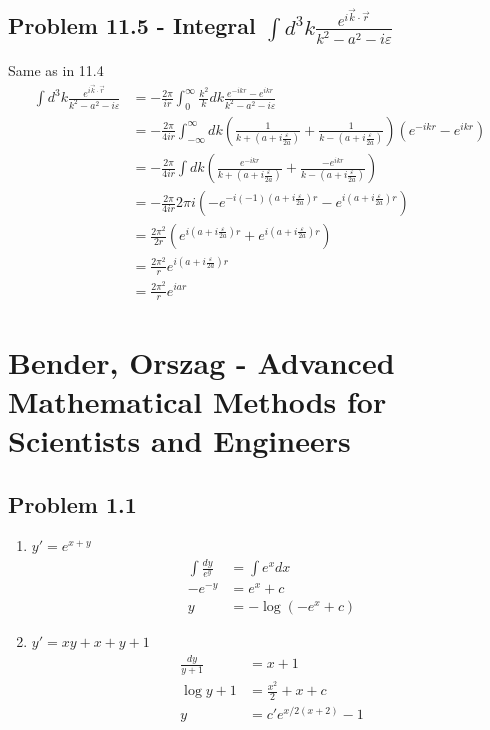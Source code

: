\documentclass[10pt,a4paper]{book}
\theoremstyle{definition}
\begin{document}
\subsection{Problem 11.5 - Integral $\int d^3k \frac{e^{i\vec{k}\cdot\vec{r}}}{k^2-a^2-i\varepsilon}$}
Same as in 11.4
\begin{align}
\int d^3k \frac{e^{i\vec{k}\cdot\vec{r}}}{k^2-a^2-i\varepsilon}
&=-\frac{2\pi}{ir}\int_0^\infty \frac{k^2}{k}dk \frac{e^{-ikr}-e^{ikr}}{k^2-a^2-i\varepsilon}\\
&=-\frac{2\pi}{4ir}\int_{-\infty}^\infty dk \left(\frac{1}{k+(a+i\frac{\varepsilon}{2a})}+\frac{1}{k-(a+i\frac{\varepsilon}{2a})}\right)(e^{-ikr}-e^{ikr})\\
&=-\frac{2\pi}{4ir}\int dk \left(\frac{e^{-ikr}}{k+(a+i\frac{\varepsilon}{2a})}+\frac{-e^{ikr}}{k-(a+i\frac{\varepsilon}{2a})}\right)\\
&=-\frac{2\pi}{4ir}2\pi i\left(-e^{-i(-1)(a+i\frac{\varepsilon}{2a})r}-e^{i(a+i\frac{\varepsilon}{2a})r}\right)\\
&=\frac{2\pi^2}{2r}\left(e^{i(a+i\frac{\varepsilon}{2a})r}+e^{i(a+i\frac{\varepsilon}{2a})r}\right)\\
&=\frac{2\pi^2}{r}e^{i(a+i\frac{\varepsilon}{2a})r}\\
&=\frac{2\pi^2}{r}e^{iar}
\end{align}


\section{{\sc Bender, Orszag} - Advanced Mathematical Methods for Scientists and Engineers}
\subsection{Problem 1.1}
\begin{enumerate}
    \item $y'=e^{x+y}$
    \begin{align}
        \int\frac{dy}{e^y}&=\int e^xdx\\
        -e^{-y}&=e^x+c\\
        y&=-\log\left(-e^x+c\right)
    \end{align}
    \item $y'=xy+x+y+1$
    \begin{align}
        \frac{dy}{y+1}&=x+1\\
        \log y+1&=\frac{x^2}{2}+x+c\\
        y&=c'e^{x/2(x+2)}-1
    \end{align}
\end{enumerate}
\end{document}
